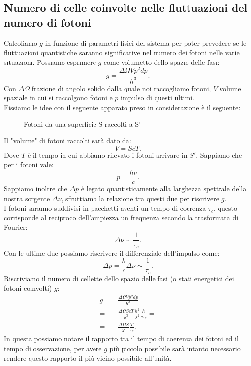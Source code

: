 \subsection{Numero di celle coinvolte nelle fluttuazioni del numero di fotoni}
\label{subsec:Numero di celle coinvolte nelle fluttuazioni del numero di fotoni}
Calcoliamo $g$ in funzione di parametri fisici del sistema per poter prevedere se le fluttuazioni quantistiche saranno significative nel numero dei fotoni nelle varie situazioni. Possiamo esprimere $g$ come volumetto dello spazio delle fasi:
\[
	g = \frac{\Delta \Omega V p^2 dp}{h^3}
.\] 
Con $\Delta \Omega $ frazione di angolo solido dalla quale noi raccogliamo fotoni, $V$ volume spaziale in cui si raccolgono fotoni e $p$ impulso di questi ultimi. \\
Fissiamo le idee con il seguente apparato preso in considerazione è il seguente:
\begin{figure}[H]
    \centering
    \caption{Fotoni da una superficie S raccolti a S'}
    \label{fig:fotoni-da-una-superficie-s-raccolti-a-s}
\end{figure}
\noindent
Il "volume" di fotoni raccolti sarà dato da:
\[
	V = S cT
.\] 
Dove $T$ è il tempo in cui abbiamo rilevato i fotoni arrivare in $S'$. Sappiamo che per i fotoni vale:
\[
	p = \frac{h\nu }{c}
.\] 
Sappiamo inoltre che $\Delta p$ è legato quantisticamente alla larghezza spettrale della nostra sorgente  $\Delta \nu $, sfruttiamo la relazione tra questi due per riscrivere $g$.\\
I fotoni saranno suddivisi in pacchetti aventi un tempo di coerenza $\tau _c$, questo corrisponde al reciproco dell'ampiezza un frequenza secondo la trasformata di Fourier:
\[
	\Delta \nu \sim  \frac{1}{\tau_c}
.\] 
Con le ultime due possiamo riscrivere il differenziale dell'impulso come:
\[
	\Delta p = \frac{h}{c}\Delta \nu \sim \frac{1}{\tau _c}
.\] 
Riscriviamo il numero di cellette dello spazio delle fasi (o stati energetici dei fotoni coinvolti) $g$:  
\[\begin{aligned}
	g 
	=&
	\frac{\Delta \Omega V p^2 dp}{h^3}=\\
	=&
	\frac{\Delta \Omega ScT }{h^3} \frac{h^2}{\lambda ^2} \frac{h}{c \tau_c}  =\\
	=&
	\frac{\Delta \Omega S}{\lambda^2}\frac{T}{\tau_c}
.\end{aligned}\]
In questa possiamo notare il rapporto tra il tempo di coerenza dei fotoni ed il tempo di osservazione, per avere $g$ più piccolo possibile sarà intanto necessario rendere questo rapporto il più vicino possibile all'unità.\\
